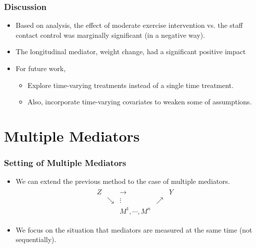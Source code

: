 \documentclass{beamer}
\begin{document}
\begin{frame}
\frametitle{Discussion}
\begin{itemize}
\item Based on analysis, the effect of moderate exercise intervention
  vs. the staff contact control was marginally significant (in a
  negative way).
\item The longitudinal mediator, weight change, had a significant
  positive impact
\item For future work,
\begin{itemize}
\item Explore time-varying treatments instead of a single time treatment.
\item Also, incorporate time-varying covariates to weaken some of assumptions.
\end{itemize}
\end{itemize}
\end{frame}


\section{Multiple Mediators}


\begin{frame}

 

\end{frame}


\begin{frame}
\frametitle{Setting of Multiple Mediators}
\begin{itemize}
\item We can extend the previous method to the case of multiple
  mediators.
\begin{eqnarray*}
\begin{array}{ccccc}
Z & & \longrightarrow & & Y \\
  & \searrow & \vdots & \nearrow & \\
  &          & M^1, \cdots, M^n & &
\end{array}     
\end{eqnarray*} 
\item We focus on the situation that mediators are measured at the
  same time (not sequentially).
\end{itemize}
\end{frame}
\end{document}
